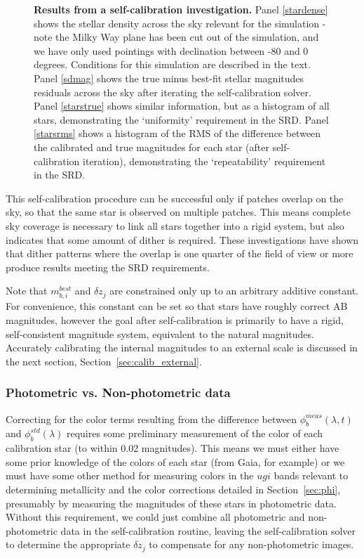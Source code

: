 \documentclass[12pt,preprint]{aastex}
\begin{document}
\begin{figure}
\caption{{\small
{\bf Results from a self-calibration investigation.} Panel \ref{stardense} shows
the stellar density across the sky relevant for the simulation - note
the Milky Way plane has been cut out of the simulation, and we have
only used pointings with declination between -80 and 0 degrees.
Conditions for this simulation are described in the text.  Panel \ref{sdmag}
shows the true minus best-fit stellar magnitudes residuals across the
sky after iterating the self-calibration solver. Panel \ref{starstrue} shows
similar information, but as a histogram of all stars, demonstrating
the `uniformity'  requirement in the SRD. Panel \ref{starsrms} shows
a histogram of the RMS of the difference between the calibrated and
true magnitudes for each star (after self-calibration iteration),
demonstrating the `repeatability' requirement in the SRD. 
}}
\label{fig:selfcal_fiducial}
\end{figure}


This self-calibration procedure can be successful only if patches
overlap on the sky, so that the same star is observed on 
multiple patches. This means complete sky coverage is necessary to
link all stars together into a rigid system, but also indicates that
some amount of dither is required. These investigations have shown
that dither patterns where the overlap is one quarter of the field of
view or more produce results meeting the SRD requirements. 

Note that $m_{b,i}^{best}$ and $\delta z_j$ are
constrained only up to an arbitrary additive constant. For
convenience, this constant can be set so that stars have roughly
correct AB magnitudes, however the goal after self-calibration is
primarily to have a rigid, self-consistent magnitude system,
equivalent to the natural magnitudes. Accurately calibrating the internal
magnitudes to an external scale is discussed in the next section, 
Section~\ref{sec:calib_external}. 

\subsubsection{Photometric vs. Non-photometric data}

Correcting for the color terms resulting from the difference between
$\phi_b^{meas}(\lambda,t)$ and $\phi_b^{std}(\lambda)$ requires some
preliminary measurement of the color of each calibration star (to
within 0.02 magnitudes).  This means we must either have some prior
knowledge of the colors of each star (from Gaia, for example) or we
must have some other method for measuring colors in the $ugi$ bands
relevant to determining metallicity and the color corrections detailed
in Section~\ref{sec:phi}, presumably by measuring the magnitudes of
these stars in photometric data.  Without
this requirement, we could just combine all photometric and
non-photometric data in the self-calibration routine, leaving the
self-calibration solver to determine the appropriate $\delta z_j$ to
compensate for any non-photometric images.
\end{document}
